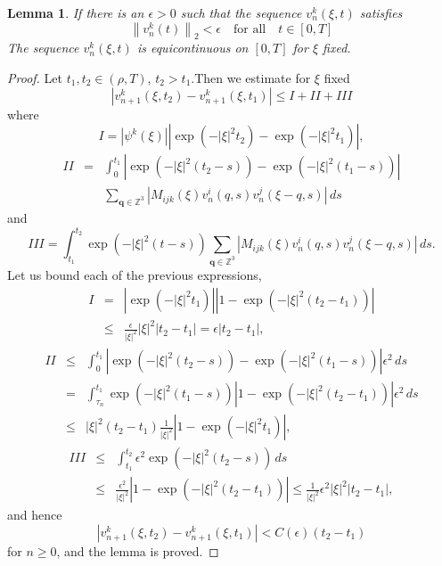 \documentclass{amsart}
\newtheorem{lemma}{Lemma}
\begin{document}
\begin{lemma}
If there is an $\epsilon>0$ such that the sequence $v_n^k\left(\xi,t\right)$ satisfies
\[
\left\|v_n^k\left(t\right)\right\|_2<\epsilon \quad\mbox{for all}\quad t\in\left[0,T\right]
\]
The sequence $v_n^k\left(\xi,t\right)$ is equicontinuous on $\left[0,T\right]$ for $\xi$ fixed.
\end{lemma}

\begin{proof}

Let $t_1,t_2 \in \left(\rho,T\right)$, $t_2>t_1$.Then 
we estimate for $\xi$ fixed
\[
\left|v_{n+1}^k\left(\xi,t_2\right)-v_{n+1}^k\left(\xi,t_1\right)\right|\leq I+II+III
\]
where
\[
I=\left|\psi^k\left(\xi\right)\right|\left|\exp\left(-\left|\xi\right|^2 t_2\right)
-\exp\left(-\left|\xi\right|^2 t_1\right)\right|,
\]
\begin{eqnarray*}
II&=&\int_{0}^{t_1}\left|\exp\left(-\left|\xi\right|^2\left(t_2-s\right)\right)
-\exp\left(-\left|\xi\right|^2\left(t_1-s\right)\right)\right| \\
&&\sum_{\mathbf{q}\in\mathbb{Z}^3}
\left|M_{ijk}\left(\xi\right)v_n^i\left(q,s\right)v_n^j\left(\xi-q,s\right)\right|\, ds
\end{eqnarray*}
and
\[
III=\int_{t_1}^{t_2}\exp\left(-\left|\xi\right|^2\left(t-s\right)\right)\sum_{\mathbf{q}\in\mathbb{Z}^3}
\left|M_{ijk}\left(\xi\right)v_n^i\left(q,s\right)v_n^j\left(\xi-q,s\right)\right|\, ds.
\]
Let us bound each of the previous expressions,
\begin{eqnarray*}
I&=&\left|\exp\left(-\left|\xi\right|^2 t_1\right)\right|
\left|1-\exp\left(-\left|\xi\right|^2\left(t_2-t_1\right)\right)\right|\\
&\leq&\frac{\epsilon}{\left|\xi\right|^2}\left|\xi\right|^2\left|t_2-t_1\right|=\epsilon\left|t_2-t_1\right|,
\end{eqnarray*}
\begin{eqnarray*}
II&\leq&\int_{0}^{t_1}\left|\exp\left(-\left|\xi\right|^2\left(t_2-s\right)\right)
-\exp\left(-\left|\xi\right|^2\left(t_1-s\right)\right)\right|\epsilon^2\,ds\\
&=&\int_{\tau_n}^{t_1}\exp\left(-\left|\xi\right|^2\left(t_1-s\right)\right)
\left|1-\exp\left(-\left|\xi\right|^2\left(t_2-t_1\right)\right)\right|\epsilon^2\,ds\\
&\leq&\left|\xi\right|^2\left(t_2-t_1\right)\frac{1}{\left|\xi\right|^2}
\left|1-\exp\left(-\left|\xi\right|^2 t_1\right)\right|,
\end{eqnarray*}
\begin{eqnarray*}
III&\leq&\int_{t_1}^{t_2}\epsilon^2\exp\left(-\left|\xi\right|^2\left(t_2-s\right)\right)\,ds\\
&\leq&\frac{\epsilon^2}{\left|\xi\right|^2}\left|1-\exp\left(-\left|\xi\right|^2\left(t_2-t_1\right)\right)\right|
\leq\frac{1}{\left|\xi\right|^2}
\epsilon^2\left|\xi\right|^2\left|t_2-t_1\right|,
\end{eqnarray*}
and hence
\[
\left|v^k_{n+1}\left(\xi,t_2\right)-v^k_{n+1}\left(\xi,t_1\right)\right|<C\left(\epsilon\right)\left(t_2-t_1\right)
\]
for $n\geq 0$, and the lemma is proved.
\end{proof}
\end{document}

